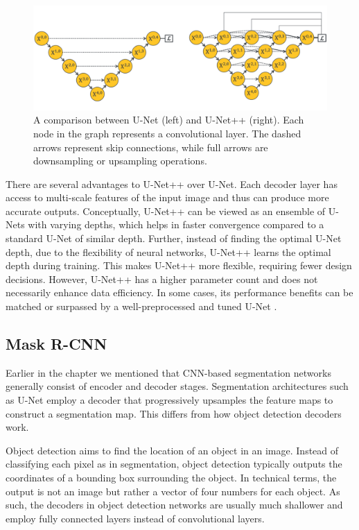  \begin{figure}[t!]
 \centering
 \includegraphics[width=\linewidth]{images/unetpp-arch}
 \caption{A comparison between U-Net (left) and U-Net++ (right). Each node in the graph represents a convolutional layer. The dashed arrows represent skip connections, while full arrows are downsampling or upsampling operations. \cite{zhou2019unetplusplus}}
 \label{fig:unetpp-arch}
 \end{figure}
  
There are several advantages to U-Net++ over U-Net. Each decoder layer has access to multi-scale features of the input image and thus can produce more accurate outputs. Conceptually, U-Net++ can be viewed as an ensemble of U-Nets with varying depths, which helps in faster convergence compared to a standard U-Net of similar depth. Further, instead of finding the optimal U-Net depth, due to the flexibility of neural networks, U-Net++ learns the optimal depth during training. This makes U-Net++ more flexible, requiring fewer design decisions. However, U-Net++ has a higher parameter count and does not necessarily enhance data efficiency. In some cases, its performance benefits can be matched or surpassed by a well-preprocessed and tuned U-Net \cite{isenseeNnUNetSelfconfiguringMethod2021}.

\subsection{Mask R-CNN}

Earlier in the chapter we mentioned that CNN-based segmentation networks generally consist of encoder and decoder stages. Segmentation architectures such as U-Net employ a decoder that progressively upsamples the feature maps to construct a segmentation map. This differs from how object detection decoders work.

Object detection aims to find the location of an object in an image. Instead of classifying each pixel as in segmentation, object detection typically outputs the coordinates of a bounding box surrounding the object. In technical terms, the output is not an image but rather a vector of four numbers for each object. As such, the decoders in object detection networks are usually much shallower and employ fully connected layers instead of convolutional layers.

